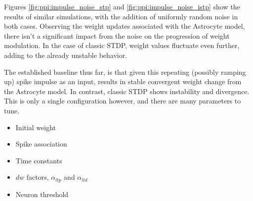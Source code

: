 
Figures \ref{fig:ppi:impulse_noise_stp} and \ref{fig:ppi:impulse_noise_istp}
show the results of similar simulations, with the addition of uniformly random
noise in both cases. Observing the weight updates associated with the Astrocyte
model, there isn't a significant impact from the noise on the progression of
weight modulation. In the case of classic STDP, weight values fluctuate even
further, adding to the already unstable behavior.



The established baseline thus far, is that given this repeating (possibly
ramping up) spike impulse as an input, results in stable convergent weight
change from the Astrocyte model. In contrast, classic STDP shows instability and
divergence. This is only a single configuration however, and there are many
parameters to tune.
\begin{itemize}
\item Initial weight
\item Spike association
\item Time constants
\item $dw$ factors, $\alpha_{ltp}$ and $\alpha_{ltd}$
\item Neuron threshold
\end{itemize}

